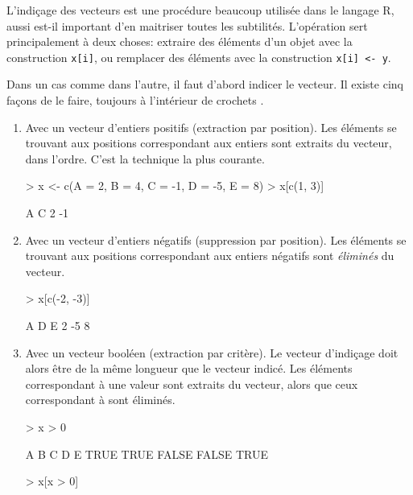 L'indiçage des vecteurs est une procédure
beaucoup utilisée dans le langage R, aussi est-il important d'en
maitriser toutes les subtilités. L'opération sert principalement à
deux choses: extraire des éléments d'un objet avec la construction
\verb|x[i]|\icode{[}, ou remplacer des éléments avec la
construction \verb|x[i] <- y|\Icode{[<-}.

Dans un cas comme dans l'autre, il faut d'abord indicer le vecteur. Il
existe cinq façons de le faire, toujours à l'intérieur de crochets
\code{[~]}.
\begin{enumerate}
\item Avec un vecteur d'entiers positifs (extraction par position).
  Les éléments se trouvant aux positions correspondant aux entiers
  sont extraits du vecteur, dans l'ordre. C'est la technique la plus
  courante.
\begin{Schunk}
\begin{Sinput}
> x <- c(A = 2, B = 4, C = -1, D = -5, E = 8)
> x[c(1, 3)]
\end{Sinput}
\begin{Soutput}
 A  C
 2 -1
\end{Soutput}
\end{Schunk}
\item Avec un vecteur d'entiers négatifs (suppression par position).
  Les éléments se trouvant aux positions correspondant aux entiers
  négatifs sont \emph{éliminés} du vecteur.
\begin{Schunk}
\begin{Sinput}
> x[c(-2, -3)]
\end{Sinput}
\begin{Soutput}
 A  D  E
 2 -5  8
\end{Soutput}
\end{Schunk}
\item Avec un vecteur booléen (extraction par critère). Le vecteur
  d'indiçage doit alors être de la même longueur que le vecteur
  indicé. Les éléments correspondant à une valeur  sont
  extraits du vecteur, alors que ceux correspondant à 
  sont éliminés.
\begin{Schunk}
\begin{Sinput}
> x > 0
\end{Sinput}
\begin{Soutput}
    A     B     C     D     E
 TRUE  TRUE FALSE FALSE  TRUE
\end{Soutput}
\begin{Sinput}
> x[x > 0]
\end{Sinput}

\end{Schunk}
\end{enumerate}

